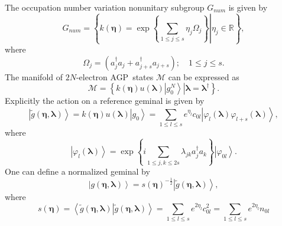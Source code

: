 \documentclass[aps,preprint]{revtex4}%
\begin{document}
The occupation number variation nonunitary subgroup $G_{num}$ is given by
\begin{equation}
G_{num}=\left\{  \left.  k\left(  \boldsymbol{\eta}\right)  =\exp\left\{
\sum_{1\leq j\leq s}\eta_{j}\Omega_{j}\right\}  \right\vert \eta_{j}%
\in\mathbb{R}\right\}  , \label{occup}%
\end{equation}
where
\begin{equation}
\Omega_{j}=\left(  a_{j}^{\dagger}a_{j}+a_{j+s}^{\dagger}a_{j+s}\right)
;\quad1\leq j\leq s.
\end{equation}
The manifold of $2N$-electron AGP\ states $\mathcal{M}$ can be expressed as
\begin{equation}
\mathcal{M}\mathcal{=}\left\{  \left.  \overset{}{k\left(  \boldsymbol{\eta
}\right)  u\left(  \boldsymbol{\lambda}\right)  }\left\vert g_{0}%
^{N}\right\rangle \right\vert \right.  \left.  \boldsymbol{\lambda
}=\boldsymbol{\lambda}^{\dagger}\right\}  .
\end{equation}
Explicitly the action on a reference geminal is given by
\begin{equation}
\left\vert \tilde{g}\left(  \boldsymbol{\eta},\boldsymbol{\lambda}\right)
\right\rangle =k\left(  \boldsymbol{\eta}\right)  u\left(  \boldsymbol{\lambda
}\right)  \left\vert g_{0}\right\rangle =\sum_{1\leq l\leq s}e^{\eta_{l}%
}c_{0l}\left\vert \varphi_{l}\left(  \boldsymbol{\lambda}\right)
\varphi_{l+s}\left(  \boldsymbol{\lambda}\right)  \right\rangle ,
\end{equation}
where
\begin{equation}
\left\vert \varphi_{l}\left(  \boldsymbol{\lambda}\right)  \right\rangle
=\exp\left\{  i\sum_{1\leq j,k\leq2s}\lambda_{jk}a_{j}^{\dagger}a_{k}\right\}
\left\vert \varphi_{0l}\right\rangle .
\end{equation}
One can define a normalized geminal by
\begin{equation}
\left\vert g\left(  \boldsymbol{\eta},\boldsymbol{\lambda}\right)
\right\rangle =\mathit{s}\left(  \boldsymbol{\eta}\right)  ^{-\frac{1}{2}%
}\left\vert \tilde{g}\left(  \boldsymbol{\eta},\boldsymbol{\lambda}\right)
\right\rangle ,
\end{equation}
where
\begin{equation}
\mathit{s}\left(  \boldsymbol{\eta}\right)  =\left\langle \left.  \tilde
{g}\left(  \boldsymbol{\eta},\boldsymbol{\lambda}\right)  \right\vert
\tilde{g}\left(  \boldsymbol{\eta},\boldsymbol{\lambda}\right)  \right\rangle
=\sum_{1\leq l\leq s}e^{2\eta_{l}}c_{0l}^{2}=\sum_{1\leq l\leq s}e^{2\eta_{l}%
}n_{0l}%
\end{equation}
\end{document}
